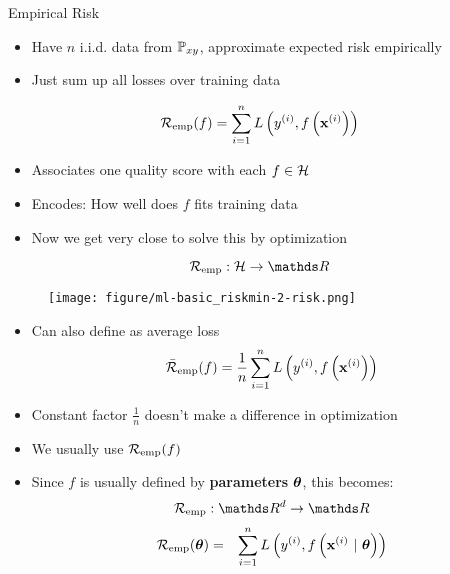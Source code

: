 \documentclass[11pt,compress,t,notes=noshow, xcolor=table]{beamer}
\begin{document}
\begin{vbframe}{Empirical Risk}

\begin{itemize}
\item Have $n$ i.i.d. data from $\mathbb{P}_{xy}$, approximate expected risk empirically %

\item Just sum up all losses over training data

\end{itemize}

$$ \mathcal{R}_{\text{emp}}(f) = \sum\limits_{i=1}^n L\left(y^{(i)}, f\left(\mathbf{x}^{(i)}\right)\right) $$

\begin{itemize}

\item Associates one quality score with each $f \in \mathcal{H}$
\item Encodes: How well does $f$ fits training data
\item Now we get very close to solve this by optimization 

\end{itemize}

$$ \riske:  \Hspace \to \R $$  
\begin{center}
\begin{figure}[!b]
\texttt{[image: figure/ml-basic\_riskmin-2-risk.png]}
\end{figure}
\end{center}

\framebreak 
   
\begin{itemize}
\item Can also define as average loss
  $$
    \bar{\mathcal{R}}_{\text{emp}}(f) = \frac{1}{n}\sum\limits_{i=1}^n L\left(y^{(i)}, f\left(\mathbf{x}^{(i)}\right)\right)
  $$
  \item Constant factor $\frac{1}{n}$ doesn't make a difference in optimization
  \item We usually use $\mathcal{R}_{\text{emp}}(f)$ 
\item Since $f$ is usually defined by \textbf{parameters} $\bm{\theta}$, this becomes:
$$\riske : \R^d \to \R$$
\begin{eqnarray*}
\mathcal{R}_{\text{emp}}(\bm{\theta}) & = & \sum\limits_{i=1}^n L\left(y^{(i)}, f\left(\mathbf{x}^{(i)} ~|~ \bm{\theta}\right)\right) \cr
\end{eqnarray*}
 

\end{itemize}
   
   
\end{vbframe}
\end{document}
